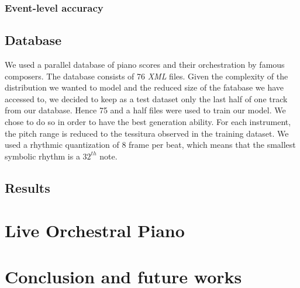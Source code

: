 \documentclass{article} %
\begin{document}
\subsubsection{Event-level accuracy}

\subsection{Database}
We used a parallel database of piano scores and their orchestration by famous composers. The database consists of 76 \textit{XML} files. Given the complexity of the distribution we wanted to model and the reduced size of the fatabase we have accessed to, we decided to keep as a test dataset only the last half of one track from our database. Hence 75 and a half files were used to train our model. We chose to do so in order to have the best generation ability.
For each instrument, the pitch range is reduced to the tessitura observed in the training dataset. We used a rhythmic quantization of 8 frame per beat, which means that the smallest symbolic rhythm is a $32^{th}$ note.

\subsection{Results}


\section{Live Orchestral Piano}


\section{Conclusion and future works}



\end{document}
